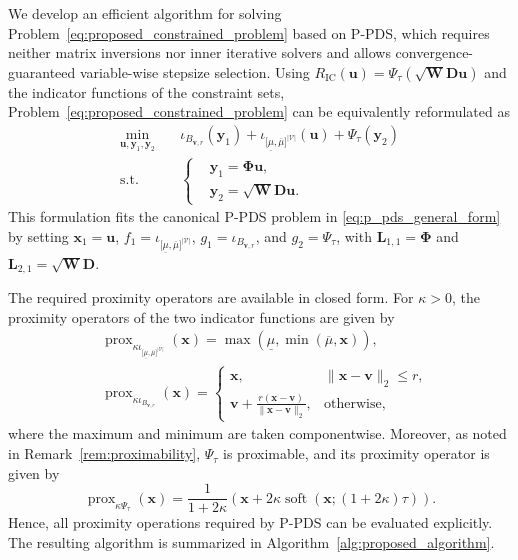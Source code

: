 We develop an efficient algorithm for solving
Problem~\eqref{eq:proposed_constrained_problem} based on P-PDS, which
requires neither matrix inversions nor inner iterative solvers and allows
convergence-guaranteed variable-wise stepsize selection.
Using
$R_{\mathrm{IC}}(\mathbf{u})
=
\Psi_{\tau}(\sqrt{\mathbf{W}}\mathbf{D}\mathbf{u})$
and the indicator functions of the constraint sets,
Problem~\eqref{eq:proposed_constrained_problem} can be equivalently
reformulated as
\begin{equation}
\begin{aligned}
\min_{\mathbf{u},\mathbf{y}_1,\mathbf{y}_2}\quad
&
\iota_{B_{\mathbf{v},r}}(\mathbf{y}_1)
+
\iota_{\lbrack\underline{\mu},\overline{\mu}\rbrack^{|\mathcal{V}|}}
(\mathbf{u})
+
\Psi_{\tau}(\mathbf{y}_2)
\\
\mathrm{s.t.}\quad
&
\left\{
\begin{aligned}
&\mathbf{y}_1=\boldsymbol{\Phi}\mathbf{u},\\
&\mathbf{y}_2=\sqrt{\mathbf{W}}\mathbf{D}\mathbf{u}.
\end{aligned}
\right.
\end{aligned}
\label{eq:p_pds_formulation}
\end{equation}
This formulation fits the canonical P-PDS problem in
\eqref{eq:p_pds_general_form} by setting
$\mathbf{x}_1=\mathbf{u}$,
$f_1=
\iota_{\lbrack\underline{\mu},\overline{\mu}\rbrack^{|\mathcal{V}|}}$,
$g_1=\iota_{B_{\mathbf{v},r}}$, and
$g_2=\Psi_{\tau}$, with
$\mathbf{L}_{1,1}=\boldsymbol{\Phi}$ and
$\mathbf{L}_{2,1}=\sqrt{\mathbf{W}}\mathbf{D}$.

The required proximity operators are available in closed form.
For $\kappa>0$, the proximity operators of the two indicator functions
are given by
\begin{equation}
\begin{aligned}
&\operatorname{prox}_{
\kappa
\iota_{\lbrack\underline{\mu},\overline{\mu}\rbrack^{|\mathcal{V}|}}
}
(\mathbf{x})
=
\max\!\left(
\underline{\mu},
\min\!\left(\overline{\mu},\mathbf{x}\right)
\right),
\\
&\operatorname{prox}_{\kappa\iota_{B_{\mathbf{v},r}}}(\mathbf{x})
=
\begin{cases}
\mathbf{x},
& \|\mathbf{x}-\mathbf{v}\|_2\leq r,
\\[1mm]
\displaystyle
\mathbf{v}
+
\frac{r(\mathbf{x}-\mathbf{v})}
{\|\mathbf{x}-\mathbf{v}\|_2},
& \text{otherwise},
\end{cases}
\end{aligned}
\label{eq:prox_constraint_sets}
\end{equation}
where the maximum and minimum are taken componentwise.
Moreover, as noted in Remark~\ref{rem:proximability}, $\Psi_{\tau}$ is proximable, and its proximity operator is given by
\begin{equation}
\operatorname{prox}_{\kappa\Psi_{\tau}}(\mathbf{x})
=
\frac{1}{1+2\kappa}\left(\mathbf{x}
+
2\kappa\operatorname{soft}
\left(
\mathbf{x};
(1+2\kappa)\tau
\right)\right).
\label{eq:prox_psi}
\end{equation}
Hence, all proximity operations required by P-PDS can be evaluated
explicitly.
The resulting algorithm is summarized in
Algorithm~\ref{alg:proposed_algorithm}.

